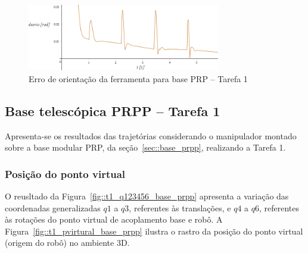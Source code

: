 \begin{figure}[h!]
	\centering 
 	\includegraphics[width=0.75\textwidth]{figs/t1_erroori_base_prp}
 	\caption{Erro de orientação da ferramenta para base PRP -- Tarefa
 	1}
 	\label{fig::t1_erroori_base_prp}
\end{figure}


\clearpage
\subsection{Base telescópica PRPP -- Tarefa 1} \label{sec::res_prpp}

Apresenta-se os resultados das trajetórias considerando o manipulador montado
sobre a base modular PRP, da seção~\ref{sec::base_prpp}, realizando a Tarefa 1.

\subsubsection{Posição do ponto virtual}

O reusltado da Figura~\ref{fig::t1_q123456_base_prpp} apresenta a variação das
coordenadas generalizadas $q1$ a $q3$, referentes às translações, e $q4$ a $q6$,
referentes às rotações do ponto virtual de acoplamento base e robô. A
Figura~\ref{fig::t1_pvirtural_base_prpp} ilustra o rastro da posição do ponto
virtual (origem do robô) no ambiente 3D.

